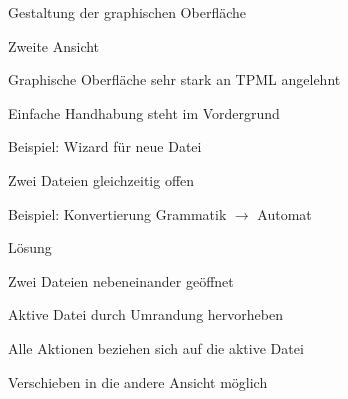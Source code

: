 



{
    \begin{itemgroup}{}
	\item Gestaltung der graphischen Oberfläche
	\item Zweite Ansicht
	\end{itemgroup}
  
	\vfill{}
}


{
    \begin{itemgroup}{}
	\item Graphische Oberfläche sehr stark an TPML angelehnt
	\item Einfache Handhabung steht im Vordergrund
		\begin{itemgroup}{}
		\item Beispiel: Wizard für neue Datei
		\end{itemgroup}	
	\end{itemgroup}
  
	\vfill{}
}


{
    \begin{itemgroup}{}
	\item Zwei Dateien gleichzeitig offen
	\item Beispiel: Konvertierung Grammatik $\to$ Automat
    \end{itemgroup}

    \begin{itemgroup}{Lösung}
	\item Zwei Dateien nebeneinander geöffnet
	\item Aktive Datei durch Umrandung hervorheben
	\item Alle Aktionen beziehen sich auf die aktive Datei
	\item Verschieben in die andere Ansicht möglich
	\end{itemgroup}
    
    \vfill{}
}


